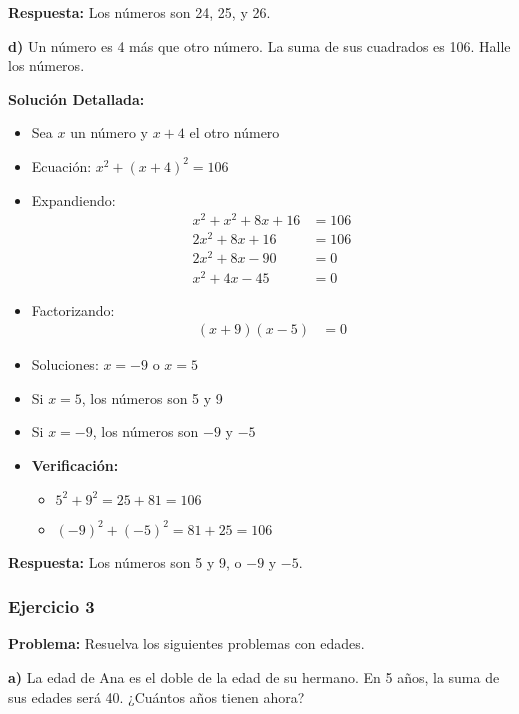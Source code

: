 \textbf{Respuesta:} Los números son 24, 25, y 26.

\medskip

\textbf{d)} Un número es 4 más que otro número. La suma de sus cuadrados es 106. Halle los números.

\textbf{Solución Detallada:}
\begin{itemize}
    \item Sea $x$ un número y $x + 4$ el otro número
    \item Ecuación: $x^2 + (x+4)^2 = 106$
    \item Expandiendo:
    \begin{align*}
    x^2 + x^2 + 8x + 16 &= 106 \\
    2x^2 + 8x + 16 &= 106 \\
    2x^2 + 8x - 90 &= 0 \\
    x^2 + 4x - 45 &= 0
    \end{align*}
    \item Factorizando:
    \begin{align*}
    (x + 9)(x - 5) &= 0
    \end{align*}
    \item Soluciones: $x = -9$ o $x = 5$
    \item Si $x = 5$, los números son 5 y 9
    \item Si $x = -9$, los números son $-9$ y $-5$
    \item \textbf{Verificación:}
    \begin{itemize}
        \item $5^2 + 9^2 = 25 + 81 = 106$ \checkmark
        \item $(-9)^2 + (-5)^2 = 81 + 25 = 106$ \checkmark
    \end{itemize}
\end{itemize}

\textbf{Respuesta:} Los números son 5 y 9, o $-9$ y $-5$.

\hrulefill


\subsubsection*{Ejercicio 3}
\textbf{Problema:} Resuelva los siguientes problemas con edades.

\medskip

\textbf{a)} La edad de Ana es el doble de la edad de su hermano. En 5 años, la suma de sus edades será 40. ¿Cuántos años tienen ahora?

